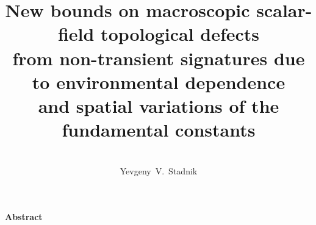 \documentclass[aps,prd,onecolumn,nofootinbib]{revtex4-2} %
\begin{document}
\title{\Large{
New bounds on macroscopic scalar-field topological defects \\from non-transient signatures due to environmental dependence \\and spatial variations of the fundamental constants
}}


\author{{\large\bf \rule[30pt]{0pt}{0pt}
Yevgeny~V.~Stadnik 
}}



\raggedbottom





\maketitle



\vspace{3mm}
\begin{center}
\Large{\textbf{Abstract}}
\end{center}
\large
\end{document}
